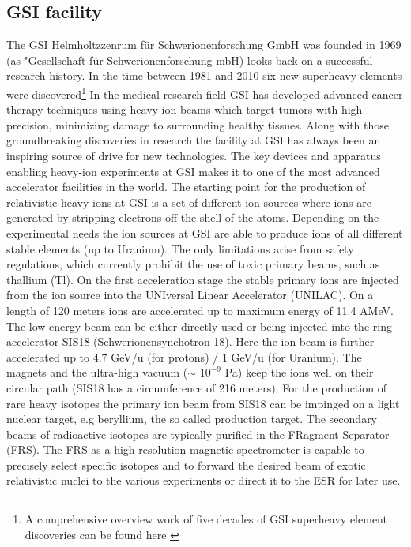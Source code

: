 \subsection{GSI facility}
The GSI Helmholtzzenrum f\"ur Schwerionenforschung GmbH was founded in 1969 (as "Gesellschaft f\"ur Schwerionenforschung mbH) looks back on a successful research history. In the time between 1981 and 2010 six new  superheavy elements were discovered\footnote{A comprehensive overview work of five decades of GSI superheavy element discoveries can be found here \cite{dullmann2022five}} \newline
In the medical research field GSI has developed advanced cancer therapy techniques using heavy ion beams which target tumors with high precision, minimizing damage to surrounding healthy tissues.\newline
Along with those groundbreaking discoveries in research the facility at GSI has always been an inspiring source of drive for new technologies.\newline
The key devices and apparatus enabling heavy-ion experiments at GSI makes it to  one of the most advanced accelerator facilities in the world.\newline
The starting point for the production of relativistic heavy ions at GSI is a set of different ion sources where ions are generated by stripping electrons off the shell of the atoms. Depending on the experimental needs the ion sources at GSI are able to produce ions of all different stable elements (up to Uranium)\cite{ion_sources_web}. The only limitations arise from safety regulations, which currently prohibit the use of toxic primary beams, such as thallium (Tl).\newline
On the first acceleration stage the stable primary ions are injected from the ion source into the UNIversal Linear Accelerator (UNILAC). On a length of 120 meters ions are accelerated up to maximum energy of 11.4 AMeV. The low energy beam can be either directly used or being injected into the ring accelerator SIS18 (Schwerionensynchotron 18). Here the ion beam is further accelerated up to 4.7 GeV/u (for protons) / 1 GeV/u (for Uranium). The magnets and  the ultra-high vacuum ($\sim$ $10^{-9}$ Pa) keep the ions well on their circular path (SIS18 has a circumference of 216 meters)\cite{sis18_web}. For the production of rare heavy isotopes the primary ion beam from SIS18 can be impinged on a light nuclear target, e.g beryllium, the so called production target. The secondary beams of radioactive isotopes are typically purified in the FRagment Separator (FRS). The FRS as a high-resolution magnetic spectrometer is capable to precisely select specific isotopes and to forward the desired beam of exotic relativistic nuclei to the various experiments or direct it to the ESR for later use.\newline
